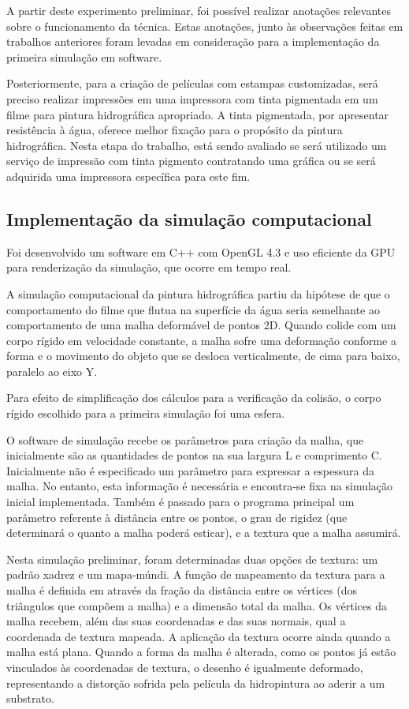 A partir deste experimento preliminar, foi possível realizar anotações relevantes sobre o funcionamento da técnica. Estas anotações, junto às observações feitas em trabalhos anteriores foram levadas em consideração para a implementação da primeira simulação em software.

Posteriormente, para a criação de películas com estampas customizadas, será preciso realizar impressões em uma impressora com tinta pigmentada em um filme para pintura hidrográfica apropriado. A tinta pigmentada, por apresentar resistência à água, oferece melhor fixação para o propósito da pintura hidrográfica. Nesta etapa do trabalho, está sendo avaliado se será utilizado um serviço de impressão com tinta pigmento contratando uma gráfica ou se será adquirida uma impressora específica para este fim.

\subsection{Implementação da simulação computacional}

Foi desenvolvido um software em C++ com OpenGL 4.3 e uso eficiente da GPU para renderização da simulação, que ocorre em tempo real. 

A simulação computacional da pintura hidrográfica partiu da hipótese de que o comportamento do filme que flutua na superfície da água seria semelhante ao comportamento de uma malha deformável de pontos 2D. Quando colide com um corpo rígido em velocidade constante, a malha sofre uma deformação conforme a forma e o movimento do objeto que se desloca verticalmente, de cima para baixo, paralelo ao eixo Y. 

Para efeito de simplificação dos cálculos para a verificação da colisão, o corpo rígido escolhido para a primeira simulação foi uma esfera.

O software de simulação recebe os parâmetros para criação da malha, que inicialmente são as quantidades de pontos na sua largura L e comprimento C. Inicialmente não é especificado um parâmetro para expressar a espessura da malha. No entanto, esta informação é necessária e encontra-se fixa na simulação inicial implementada. Também é passado para o programa principal um parâmetro referente à distância entre os pontos, o grau de rigidez (que determinará o quanto a malha poderá esticar), e a textura que a malha assumirá. 

Nesta simulação preliminar, foram determinadas duas opções de textura: um padrão xadrez e um mapa-múndi. A função de mapeamento da textura para a malha é definida em através da fração da distância entre os vértices (dos triângulos que compõem a malha) e a dimensão total da malha. Os vértices da malha recebem, além das suas coordenadas e das suas normais, qual a coordenada de textura mapeada. A aplicação da textura ocorre ainda quando a malha está plana. Quando a forma da malha é alterada, como os pontos já estão vinculados às coordenadas de textura, o desenho é igualmente deformado, representando a distorção sofrida pela película da hidropintura ao aderir a um substrato.

